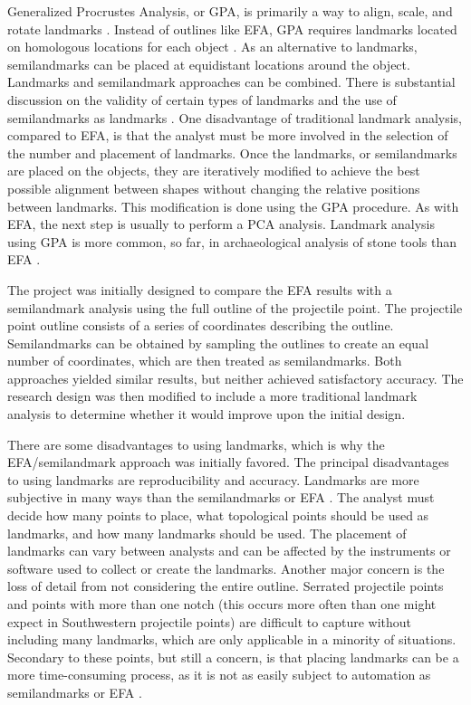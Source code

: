 \documentclass[a4paper]{article}
\begin{document}
Generalized Procrustes Analysis, or GPA, is primarily a way to align, scale, and rotate landmarks \autocite{Gower1975-uv}. Instead of outlines like EFA, GPA requires landmarks located on homologous locations for each object \autocite{Rohlf1990-mp}. As an alternative to landmarks, semilandmarks can be placed at equidistant locations around the object. Landmarks and semilandmark approaches can be combined. There is substantial discussion on the validity of certain types of landmarks and the use of semilandmarks as landmarks \autocites[e.g.,][]{De_Groote2011-mh,MacLeod2017-yl,Okumura2019-ur,Shott2010-fn}. One disadvantage of traditional landmark analysis, compared to EFA, is that the analyst must be more involved in the selection of the number and placement of landmarks. Once the landmarks, or semilandmarks are placed on the objects, they are iteratively modified to achieve the best possible alignment between shapes without changing the relative positions between landmarks. This modification is done using the GPA procedure. As with EFA, the next step is usually to perform a PCA analysis. Landmark analysis using GPA is more common, so far, in archaeological analysis of stone tools than EFA \autocites[e.g.,][]{Archer2018-zi,Bischoff2020-zn,Buchanan2015-dx,Charlin2018-yg,Fisher2018-jq,Gingerich2014-cb,Herzlinger2017-ce,Lycett2010-od,Riede2019-gb,Selden2020-ni,Shott2010-fn,Smith2015-qk,Thulman2012-fo}.

The project was initially designed to compare the EFA results with a semilandmark analysis using the full outline of the projectile point. The projectile point outline consists of a series of coordinates describing the outline. Semilandmarks can be obtained by sampling the outlines to create an equal number of coordinates, which are then treated as semilandmarks. Both approaches yielded similar results, but neither achieved satisfactory accuracy. The research design was then modified to include a more traditional landmark analysis to determine whether it would improve upon the initial design.

There are some disadvantages to using landmarks, which is why the EFA/semilandmark approach was initially favored. The principal disadvantages to using landmarks are reproducibility and accuracy. Landmarks are more subjective in many ways than the semilandmarks or EFA \autocite[see][205]{Shott2010-fn}. The analyst must decide how many points to place, what topological points should be used as landmarks, and how many landmarks should be used. The placement of landmarks can vary between analysts and can be affected by the instruments or software used to collect or create the landmarks. Another major concern is the loss of detail from not considering the entire outline. Serrated projectile points and points with more than one notch (this occurs more often than one might expect in Southwestern projectile points) are difficult to capture without including many landmarks, which are only applicable in a minority of situations. Secondary to these points, but still a concern, is that placing landmarks can be a more time-consuming process, as it is not as easily subject to automation as semilandmarks or EFA \autocite[although see][ for one of several examples of automation]{Palaniswamy2010-sl}.
\end{document}
